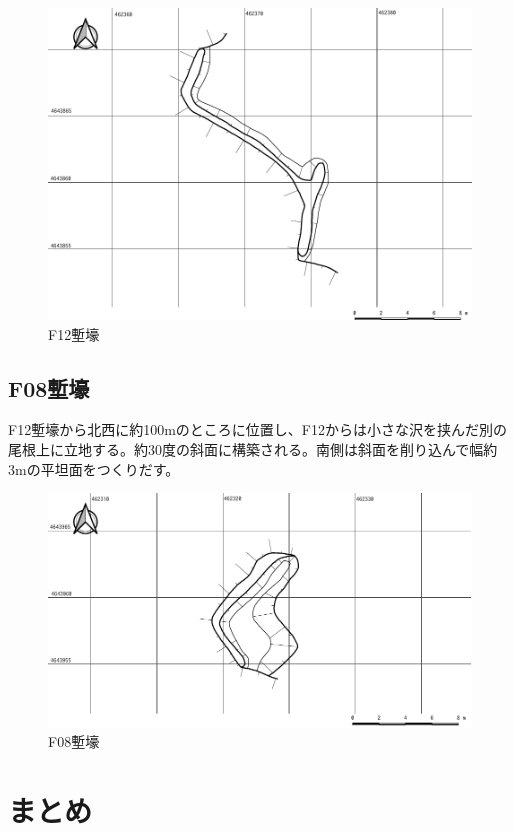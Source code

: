 \documentclass[14Q]{jsarticle}
\begin{document}
\begin{figure}[h]
\centering
\includegraphics[width=160truemm]{fig/F12.pdf}
\caption{F12塹壕}
\label{f12}
\end{figure}

\subsection{F08塹壕}
F12塹壕から北西に約100mのところに位置し、F12からは小さな沢を挟んだ別の尾根上に立地する。約30度の斜面に構築される。南側は斜面を削り込んで幅約3mの平坦面をつくりだす。

\begin{figure}[h]
\centering
\includegraphics[width=160truemm]{fig/F08.pdf}
\caption{F08塹壕}
\label{f08}
\end{figure}

\section{まとめ}
\end{document}
